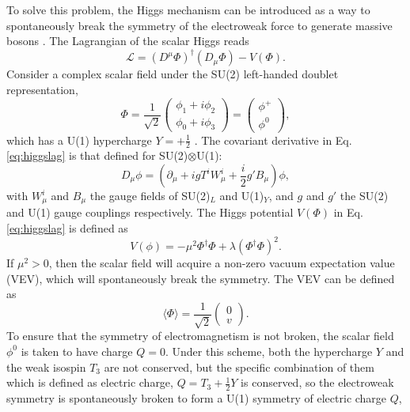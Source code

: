 \documentclass[a4paper,12pt]{article}
\begin{document}
To solve this problem, the Higgs mechanism can be introduced as a way to spontaneously break the symmetry of the electroweak force to generate massive bosons \cite{higgs}. 
The Lagrangian of the scalar Higgs reads
\begin{equation}
    \label{eq:higgslag}
    \mathcal{L} = (D^\mu\Phi)^\dagger(D_\mu\Phi) - V(\Phi).
\end{equation}
Consider a complex scalar field under the SU(2) left-handed doublet representation,
\begin{equation}
    \label{eq:doubscal}
    \Phi = \frac{1}{\sqrt{2}}\begin{pmatrix}\phi_1+i\phi_2\\\phi_0+i\phi_3\end{pmatrix} = \begin{pmatrix} \phi^+\\\phi^0\end{pmatrix},
\end{equation}
which has a U(1) hypercharge $Y=+\frac12$ \cite{dono}.
The covariant derivative in Eq.\eqref{eq:higgslag} is that defined for SU(2)$\otimes$U(1):
\begin{equation}
    \label{eq:covarhiggs}
    D_\mu\phi = \left(\partial_\mu + igT^iW_\mu^i + \frac{i}{2}g'B_\mu\right)\phi,
\end{equation}
with $W^i_\mu$ and $B_\mu$ the gauge fields of SU(2)$_L$ and U(1)$_Y$, and $g$ and $g'$ the SU(2) and U(1) gauge couplings respectively. 
The Higgs potential $V(\Phi)$ in Eq.\eqref{eq:higgslag} is defined as
\begin{equation}
    \label{eq:goldpot}
    V(\phi) = -\mu^2\Phi^\dagger\Phi + \lambda(\Phi^\dagger\Phi)^2.
\end{equation}
If $\mu^2>0$, then the scalar field will acquire a non-zero vacuum expectation value (VEV), which will spontaneously break the symmetry. 
The VEV can be defined as
\begin{equation}
    \label{eq:vev}
    \langle\Phi\rangle = \frac{1}{\sqrt{2}}\begin{pmatrix}0\\v\end{pmatrix}.
\end{equation}
To ensure that the symmetry of electromagnetism is not broken, the scalar field $\phi^0$ is taken to have charge $Q=0$.
Under this scheme, both the hypercharge $Y$ and the weak isospin $T_3$ are not conserved, but the specific combination of them which is defined as electric charge, $Q=T_3+\frac12 Y$ is conserved, so the electroweak symmetry is spontaneously broken to form a U(1) symmetry of electric charge $Q$,
\end{document}
